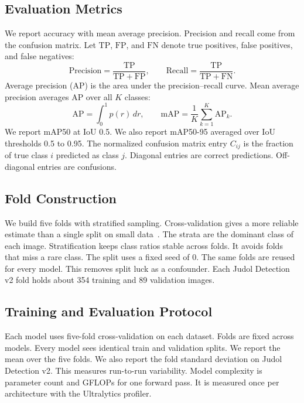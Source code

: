 \documentclass[conference,a4paper]{IEEEtran}
\begin{document}
\subsection{Evaluation Metrics}
We report accuracy with mean average precision. Precision and recall come
from the confusion matrix. Let $\mathrm{TP}$, $\mathrm{FP}$, and
$\mathrm{FN}$ denote true positives, false positives, and false negatives:
\begin{equation}
\mathrm{Precision} = \frac{\mathrm{TP}}{\mathrm{TP}+\mathrm{FP}},
\qquad
\mathrm{Recall} = \frac{\mathrm{TP}}{\mathrm{TP}+\mathrm{FN}} .
\end{equation}
Average precision (AP) is the area under the precision--recall curve. Mean
average precision averages AP over all $K$ classes:
\begin{equation}
\mathrm{AP} = \int_0^1 p(r)\,dr,
\qquad
\mathrm{mAP} = \frac{1}{K}\sum_{k=1}^{K}\mathrm{AP}_k .
\end{equation}
We report mAP50 at IoU 0.5. We also report mAP50-95 averaged over IoU
thresholds 0.5 to 0.95. The normalized confusion matrix entry $C_{ij}$ is the
fraction of true class $i$ predicted as class $j$. Diagonal entries are
correct predictions. Off-diagonal entries are confusions.

\subsection{Fold Construction}
We build five folds with stratified sampling. Cross-validation gives a more
reliable estimate than a single split on small data~\cite{kohavi1995study}. The
strata are the dominant class of each image. Stratification keeps class ratios
stable across folds. It avoids folds that miss a rare class. The split uses a
fixed seed of 0. The same folds
are reused for every model. This removes split luck as a confounder. Each Judol Detection v2
fold holds about 354 training and 89 validation images.

\subsection{Training and Evaluation Protocol}
Each model uses five-fold cross-validation on each dataset. Folds are fixed
across models. Every model sees identical train and validation splits. We
report the mean over the five folds. We also report the fold standard
deviation on Judol Detection v2. This measures run-to-run variability. Model complexity is
parameter count and GFLOPs for one forward pass. It is measured once per
architecture with the Ultralytics profiler.
\end{document}
